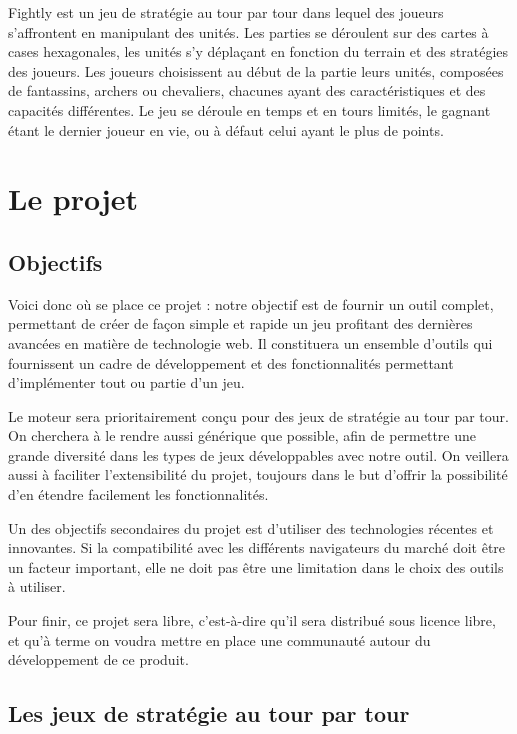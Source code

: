 \documentclass[a4paper,10pt]{report}
\begin{document}
      Fightly est un jeu de stratégie au tour par tour dans lequel des joueurs s'affrontent en manipulant des unités. Les parties se déroulent sur des cartes à cases hexagonales, les unités s'y déplaçant en fonction du terrain et des stratégies des joueurs. Les joueurs choisissent au début de la partie leurs unités, composées de fantassins, archers ou chevaliers, chacunes ayant des caractéristiques et des capacités différentes. Le jeu se déroule en temps et en tours limités, le gagnant étant le dernier joueur en vie, ou à défaut celui ayant le plus de points. 



  \chapter{Le projet}

    \section{Objectifs}

      Voici donc où se place ce projet : notre objectif est de fournir un outil complet, permettant de créer de façon simple et rapide un jeu profitant des dernières avancées en matière de technologie web. Il constituera un ensemble d'outils qui fournissent un cadre de développement et des fonctionnalités permettant d'implémenter tout ou partie d'un jeu.

      Le moteur sera prioritairement conçu pour des jeux de stratégie au tour par tour. On cherchera à le rendre aussi générique que possible, afin de permettre une grande diversité dans les types de jeux développables avec notre outil. On veillera aussi à faciliter l'extensibilité du projet, toujours dans le but d'offrir la possibilité d'en étendre facilement les fonctionnalités.

      Un des objectifs secondaires du projet est d'utiliser des technologies récentes et innovantes. Si la compatibilité avec les différents navigateurs du marché doit être un facteur important, elle ne doit pas être une limitation dans le choix des outils à utiliser. 

      Pour finir, ce projet sera libre, c'est-à-dire qu'il sera distribué sous licence libre, et qu'à terme on voudra mettre en place une communauté autour du développement de ce produit. 


    \section{Les jeux de stratégie au tour par tour}
\end{document}
